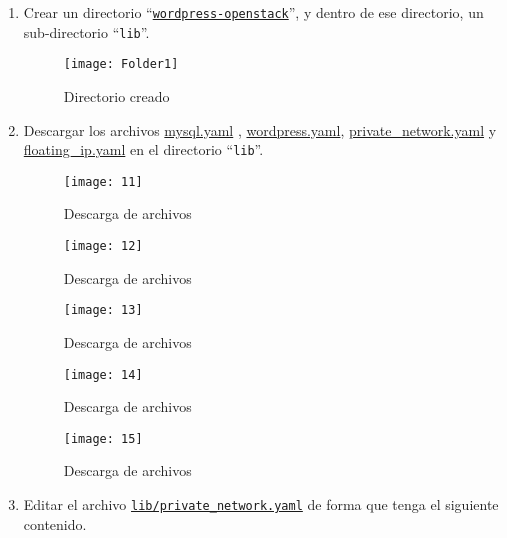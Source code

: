 \documentclass[10pt]{article}   			%
\begin{document}
 \begin{enumerate}
	\item Crear un directorio “\texttt{\href{https://github.com/wilrilo/talleres/tree/master/file/taller2/wordpress-heat}{wordpress-openstack}}”, y dentro de ese directorio, un sub-directorio “\texttt{lib}”. \\
	
	
	\begin{figure}[ht]
		\centering
		\texttt{[image: Folder1]}  
		\caption{Directorio creado}
	\end{figure}
	


	\item 	Descargar los archivos   
	\href{https://raw.githubusercontent.com/miguelgrinberg/heat-tutorial/master/lib/mysql.yaml}{mysql.yaml} ,
	\href{https://raw.githubusercontent.com/miguelgrinberg/heat-tutorial/master/lib/wordpress.yaml}{wordpress.yaml},
	\href{https://raw.githubusercontent.com/miguelgrinberg/heat-tutorial/master/lib/private\_network.yaml}{private\_network.yaml} y
	\href{https://raw.githubusercontent.com/miguelgrinberg/heat-tutorial/master/lib/floating\_ip.yaml}{floating\_ip.yaml} en el directorio “\texttt{lib}”. \\
	
	

\begin{figure}[ht]
	\centering
	\texttt{[image: 11]}  
	\caption{Descarga de archivos} 
\end{figure}
\newpage
\begin{figure}[ht]
	\centering
	\texttt{[image: 12]}  
	\caption{Descarga de archivos} 
\end{figure}

\begin{figure}[H]
	\centering
	\texttt{[image: 13]}  
	\caption{Descarga de archivos} 
\end{figure}

\begin{figure}[ht]
	\centering
	\texttt{[image: 14]}  
	\caption{Descarga de archivos} 
\end{figure}
\newpage
\begin{figure}[ht]
	\centering
	\texttt{[image: 15]}  
	\caption{Descarga de archivos} 
\end{figure}

	
\newpage
	
	\item 	Editar el archivo  \texttt{\href{https://github.com/wilrilo/talleres/blob/master/file/taller2/wordpress-heat/lib/private_network.yaml}{lib/private\_network.yaml}} de forma que tenga el siguiente contenido.\\
	


\end{enumerate}
\end{document}
